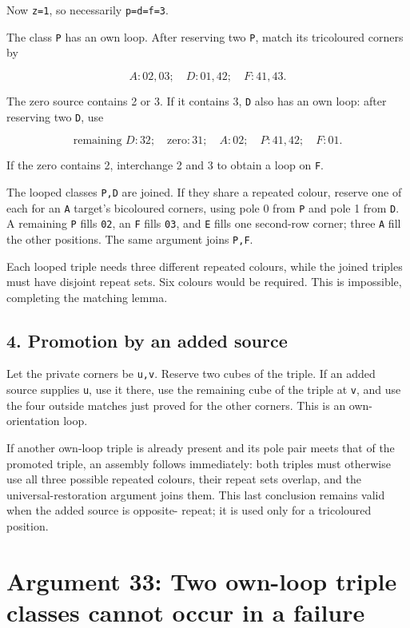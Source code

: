 \documentclass[
  10pt,
]{article}
\begin{document}
Now \texttt{z=1}, so necessarily \texttt{p=d=f=3}.

The class \texttt{P} has an own loop. After reserving two \texttt{P},
match its tricoloured corners by

\[
A:02,03;\quad D:01,42;\quad F:41,43.
\]

The zero source contains 2 or 3. If it contains 3, \texttt{D} also has
an own loop: after reserving two \texttt{D}, use

\[
\text{remaining }D:32;\quad \text{zero}:31;\quad A:02;
\quad P:41,42;\quad F:01.
\]

If the zero contains 2, interchange 2 and 3 to obtain a loop on
\texttt{F}.

The looped classes \texttt{P,D} are joined. If they share a repeated
colour, reserve one of each for an \texttt{A} target's bicoloured
corners, using pole 0 from \texttt{P} and pole 1 from \texttt{D}. A
remaining \texttt{P} fills \texttt{02}, an \texttt{F} fills \texttt{03},
and \texttt{E} fills one second-row corner; three \texttt{A} fill the
other positions. The same argument joins \texttt{P,F}.

Each looped triple needs three different repeated colours, while the
joined triples must have disjoint repeat sets. Six colours would be
required. This is impossible, completing the matching lemma.

\hypertarget{promotion-by-an-added-source}{%
\subsection*{4. Promotion by an added
source}\label{promotion-by-an-added-source}}

Let the private corners be \texttt{u,v}. Reserve two cubes of the
triple. If an added source supplies \texttt{u}, use it there, use the
remaining cube of the triple at \texttt{v}, and use the four outside
matches just proved for the other corners. This is an own-orientation
loop.

If another own-loop triple is already present and its pole pair meets
that of the promoted triple, an assembly follows immediately: both
triples must otherwise use all three possible repeated colours, their
repeat sets overlap, and the universal-restoration argument joins them.
This last conclusion remains valid when the added source is opposite-
repeat; it is used only for a tricoloured position.

\hypertarget{arg-33}{%
\section{Argument 33: Two own-loop triple classes cannot occur in a
failure}\label{arg-33}}
\end{document}
